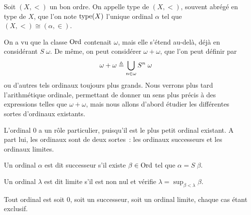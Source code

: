 \begin{definition}
  Soit $(X,<)$ un bon ordre. On appelle type de $(X,<)$, souvent abrégé en
  type de $X$, que l'on note $\operatorname{type}(X)$ l'unique ordinal $\alpha$ tel que
  $(X,<)\cong (\alpha,\in)$.
\end{definition}

On a vu que la classe $\operatorname{Ord}$ contenait $\omega$, mais elle s'étend au-delà, déjà
en considérant $S\;\omega$. De même, on peut considérer $\omega + \omega$, que
l'on peut définir par
\[\omega + \omega \triangleq \bigcup_{n \in \omega} S^n\;\omega\]
ou d'autres tels ordinaux toujours plus grands. Nous verrons plus tard
l'arithmétique ordinale, permettant de donner un sens plus précis à des
expressions telles que $\omega + \omega$, mais nous allons d'abord étudier les
différentes sortes d'ordinaux existants.

L'ordinal $0$ a un rôle particulier, puisqu'il est le plus petit ordinal
existant. A part lui, les ordinaux sont de deux sortes~: les ordinaux
successeurs et les ordinaux limites.

\begin{definition}
  Un ordinal $\alpha$ est dit successeur s'il existe $\beta \in \operatorname{Ord}$ tel que
  $\alpha = S\;\beta$.
\end{definition}

\begin{definition}
  Un ordinal $\lambda$ est dit limite s'il est non nul et vérifie
  $\lambda = \sup_{\beta < \lambda} \beta$.
\end{definition}

\begin{property}
  Tout ordinal est soit $0$, soit un successeur, soit un ordinal limite, chaque
  cas étant exclusif.
\end{property}

